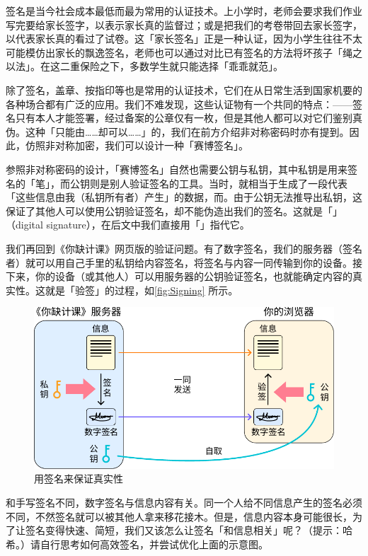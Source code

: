 签名是当今社会成本最低而最为常用的认证技术。上小学时，老师会要求我们作业写完要给家长签字，以表示家长真的监督过；或是把我们的考卷带回去家长签字，以代表家长真的看过了试卷。这「家长签名」正是一种认证，因为小学生往往不太可能模仿出家长的飘逸签名，老师也可以通过对比已有签名的方法将坏孩子「绳之以法」。在这二重保险之下，多数学生就只能选择「乖乖就范」。

除了签名，盖章、按指印等也是常用的认证技术，它们在从日常生活到国家机要的各种场合都有广泛的应用。我们不难发现，这些认证物有一个共同的特点：——签名只有本人才能签署，经过备案的公章仅有一枚，但是其他人都可以对它们鉴别真伪。这种「只能由……却可以……」的，我们在前方介绍非对称密码时亦有提到。因此，仿照非对称加密，我们可以设计一种「赛博签名」。

参照非对称密码的设计，「赛博签名」自然也需要公钥与私钥，其中私钥是用来签名的「笔」，而公钥则是别人验证签名的工具。当时，就相当于生成了一段代表「这些信息由我（私钥所有者）产生」的数据，而。由于公钥无法推导出私钥，这保证了其他人可以使用公钥验证签名，却不能伪造出我们的签名。这就是「」（digital signature），在后文中我们直接用「」指代它。

我们再回到《你缺计课》网页版的验证问题。有了数字签名，我们的服务器（签名者）就可以用自己手里的私钥给内容签名，将签名与内容一同传输到你的设备。接下来，你的设备（或其他人）可以用服务器的公钥验证签名，也就能确定内容的真实性。这就是「验签」的过程，如\autoref{fig:Signing} 所示。

\begin{figure}[htb!]
  \centering
  \includegraphics[width=.62\textwidth]{assets/surpass/Signing.pdf}
  \caption{用签名来保证真实性}
  \label{fig:Signing}
\end{figure}

\begin{note}
  和手写签名不同，数字签名与信息内容有关。同一个人给不同信息产生的签名必须不同，不然签名就可以被其他人拿来移花接木。但是，信息内容本身可能很长，为了让签名变得快速、简短，我们又该怎么让签名「和信息相关」呢？（提示：哈希。）请自行思考如何高效签名，并尝试优化上面的示意图。
\end{note}

